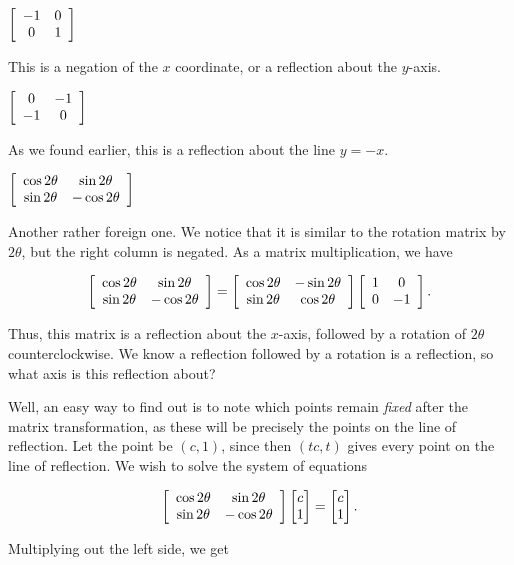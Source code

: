 \documentclass[../key.tex]{subfiles}
\begin{document}
\begin{inner_problem}
\item $\left[\begin{array}{cc} -1 & 0 \\ 0 & 1 \end{array}\right]$ \label{prob:highlighted_example_list_transformations1}
\end{inner_problem}

This is a negation of the $x$ coordinate, or a reflection about the $y$-axis.

\begin{inner_problem}
\item $\left[\begin{array}{cc} 0 & -1 \\ -1 & 0 \end{array}\right]$ \label{prob:highlighted_example_list_transformations2}
\end{inner_problem}

As we found earlier, this is a reflection about the line $y=-x$.

\begin{inner_problem}
\item $\left[\begin{array}{cc} \cos 2\theta & \sin 2\theta \\ \sin 2\theta & -\cos 2\theta \end{array}\right]$ \label{prob:list_transformations_part_end}
\end{inner_problem}

Another rather foreign one. We notice that it is similar to the rotation matrix by $2\theta$, but the right column is negated. As a matrix multiplication, we have

$$\left[\begin{array}{cc} \cos 2\theta & \sin 2\theta \\ \sin 2\theta & -\cos 2\theta \end{array}\right] = \left[\begin{array}{cc} \cos 2\theta & -\sin 2\theta \\ \sin 2\theta & \cos 2\theta \end{array}\right]\left[\begin{array}{cc} 1 & 0 \\ 0 & -1 \end{array}\right].$$

Thus, this matrix is a reflection about the $x$-axis, followed by a rotation of $2\theta$ counterclockwise. We know a reflection followed by a rotation is a reflection, so what axis is this reflection about?

Well, an easy way to find out is to note which points remain \textit{fixed} after the matrix transformation, as these will be precisely the points on the line of reflection. Let the point be $(c,1)$, since then $(tc,t)$ gives every point on the line of reflection. We wish to solve the system of equations

$$\left[\begin{array}{cc} \cos 2\theta & \sin 2\theta \\ \sin 2\theta & -\cos 2\theta \end{array}\right]\begin{bmatrix} c \\ 1 \end{bmatrix} = \begin{bmatrix} c \\ 1 \end{bmatrix}.$$

Multiplying out the left side, we get
\end{document}
